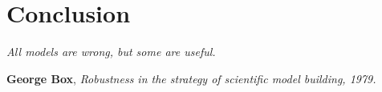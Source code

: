 \documentclass[12pt,french,twoside,openright]{report}
\begin{document}
\setcounter{chapter}{6}
\setcounter{secnumdepth}{-1}
\chapter{Conclusion}
\begin{flushleft}
\textit{All models are wrong, but some are useful.}
\end{flushleft}
\begin{flushright}
\textbf{George Box}, \textit{Robustness in the strategy of scientific model building, 1979.}
\end{flushright}
\pagestyle{Conclusion}

%
\end{document}
